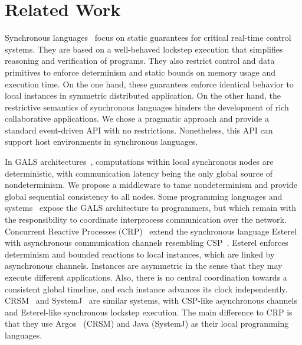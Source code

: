\documentclass[sigplan,screen]{acmart}
\begin{document}
\section{Related Work}
\label{sec.related}

Synchronous languages~\cite{langs} focus on static guarantees for critical
real-time control systems.
They are based on a well-behaved lockstep execution that simplifies reasoning
and verification of programs.
They also restrict control and data primitives to enforce determinism and
static bounds on memory usage and execution time.
On the one hand, these guarantees enforce identical behavior to local instances
in symmetric distributed application.
On the other hand, the restrictive semantics of synchronous languages hinders
the development of rich collaborative applications.
We chose a pragmatic approach and provide a standard event-driven API with no
restrictions.
Nonetheless, this API can support host environments in synchronous languages.

In GALS architectures~\cite{gals.taxonomy}, computations within local
synchronous nodes are deterministic, with communication latency being the only
global source of nondeterminism.
We propose a middleware to tame nondeterminism and provide global sequential
consistency to all nodes.
%
Some programming languages and systems~\cite{gals.crp,gals.crsm,gals.systemj}
expose the GALS architecture to programmers, but which remain with the
responsibility to coordinate interprocess communication over the network.
%
Concurrent Reactive Processes (CRP)~\cite{gals.crp} extend the synchronous
language Esterel~\cite{esterel} with asynchronous communication
channels resembling CSP~\cite{csp}.
%
Esterel enforces determinism and bounded reactions to local instances, which
are linked by asynchronous channels.
Instances are asymmetric in the sense that they may execute different
applications.
Also, there is no central coordination towards a consistent global timeline,
and each instance advances its clock independently.
%
CRSM~\cite{gals.crsm} and SystemJ~\cite{gals.systemj} are similar systems, with
CSP-like asynchronous channels and Esterel-like synchronous lockstep execution.
The main difference to CRP is that they use Argos~\cite{argos} (CRSM) and Java
(SystemJ) as their local programming languages.
\end{document}
